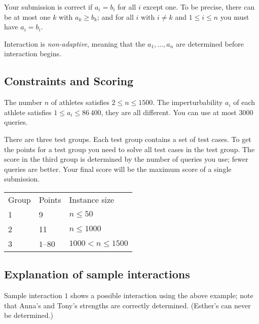 Your submission is correct if $a_i=b_i$ for all $i$ except one.
To be precise, there can be at most one $k$ with $a_k\geq b_k$;
and for all $i$ with $i\neq k$ and $1\leq i\leq n$ you must have $a_i=b_i$.

Interaction is \emph{non-adaptive}, meaning that the $a_1,\ldots, a_n$ are determined before interaction begins.

\subsection*{Constraints and Scoring}

The number $n$ of athletes satisfies 
$2\leq n\leq 1500$. %
The imperturbability $a_i$ of each athlete satisfies 
$1\leq a_i\leq 86\,400$, %
they are all different. %
You can use at most $3000$ queries.

There are three test groups.
Each test group contains a set of test cases. 
To get the points for a test group you need to solve all test cases in the test group.
The score in the third group is determined by the number of queries you use;
fewer queries are better.
Your final score will be the maximum score of a single submission.

\medskip
\begin{tabular}{lll}
Group & Points & Instance size\\
1  &  9 & $n\leq 50$\\
2  &  11 & $n\leq 1000$\\
3  &  $1$--$80$ & $1000 < n\leq 1500$\\
\end{tabular}

\subsection*{Explanation of sample interactions}


Sample interaction $1$ shows a possible interaction using the above example; note that Anna's and Tony's strengths are correctly determined.
(Esther's can never be determined.)
